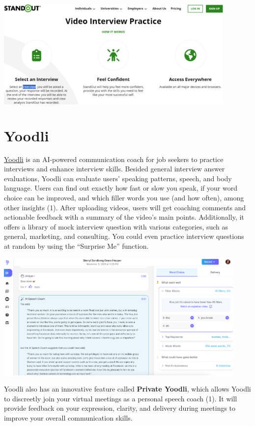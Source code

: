\documentclass[
]{book}
\begin{document}
\includegraphics[width=4.64583in,height=\textheight]{standout pic.png}

\hypertarget{yoodli}{%
\section{Yoodli}\label{yoodli}}

\href{https://app.yoodli.ai/}{Yoodli} is an AI-powered communication coach for job seekers to practice interviews and enhance interview skills. Besided general interview answer evaluations, Yoodli can evaluate users' speaking patterns, speech, and body language. Users can find out exactly how fast or slow you speak, if your word choice can be improved, and which filler words you use (and how often), among other insights (1). After uploading videos, users will get coaching comments and actionable feedback with a summary of the video's main points. Additionally, it offers a library of mock interview question with various categories, such as general, marketing, and consulting. You could even practice interview questions at random by using the ``Surprise Me'' function.

\includegraphics[width=4.85417in,height=\textheight]{yoodli pic 1.png}

Yoodli also has an innovative feature called \textbf{Private Yoodli}, which allows Yoodli to discreetly join your virtual meetings as a personal speech coach (1). It will provide feedback on your expression, clarity, and delivery during meetings to improve your overall communication skills.
\end{document}
